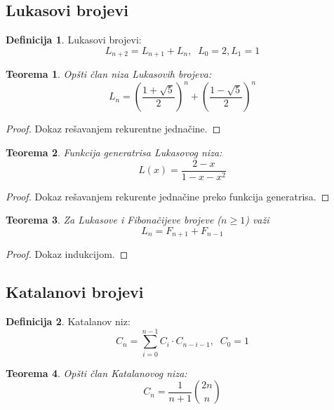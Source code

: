 \documentclass[a4paper,12pt]{article}
\numberwithin{algorithm}{section}
\theoremstyle{plain}
\newtheorem{theorem}{Teorema}[section]
\theoremstyle{definition}
\newtheorem{definition}{Definicija}[section]
\theoremstyle{remark}
\begin{document}
\subsection{Lukasovi brojevi}
\begin{definition}
    Lukasovi brojevi:
    \[ L_{n+2} = L_{n+1} + L_n, \;\; L_0 = 2, L_1 = 1 \]
\end{definition}
\begin{theorem}
    Opšti član niza Lukasovih brojeva:
    \[ L_n = \left( \frac{1 + \sqrt{5}}{2} \right)^n + \left( \frac{1 - \sqrt{5}}{2} \right)^n \]
\end{theorem}
\begin{proof}
    Dokaz rešavanjem rekurentne jednačine.
\end{proof}
\begin{theorem}
    Funkcija generatrisa Lukasovog niza:
    \[
        L(x) = \frac{2-x}{1-x-x^2}
    \]
\end{theorem}
\begin{proof}
    Dokaz rešavanjem rekurente jednačine preko funkcija generatrisa.
\end{proof}
\begin{theorem}
    Za Lukasove i Fibonačijeve brojeve ($n \geq 1$) važi
    \[ L_n = F_{n+1} + F_{n-1} \]
\end{theorem}
\begin{proof}
    Dokaz indukcijom.
\end{proof}
\subsection{Katalanovi brojevi}
\begin{definition}
    Katalanov niz:
    \[ C_n = \sum_{i=0}^{n-1}C_i \cdot C_{n-i-1},\;\; C_0 = 1 \]
\end{definition}
\begin{theorem}
    Opšti član Katalanovog niza:
    \[ C_n = \frac{1}{n+1} {{2n} \choose n} \]
\end{theorem}

\newpage
\tableofcontents
\end{document}
